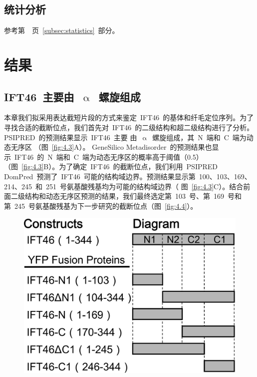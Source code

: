 \subsection{统计分析}
参考第\ \pageref{subsec:statistics}\ 页\ \ref{subsec:statistics}\ 部分。

\section{结果}
\subsection{IFT46\ 主要由\ \texorpdfstring{$\upalpha$}{α}\ 螺旋组成}
本章我们拟采用表达截短片段的方式来鉴定\ IFT46\ 的基体和纤毛定位序列。为了寻找合适的截断位点，我们首先对\ IFT46\ 的二级结构和超二级结构进行了分析。PSIPRED\ 的预测结果显示\ IFT46\ 主要
由\ $\upalpha$\ 螺旋组成，其\ N\ 端和\ C\ 端为动态无序区
（图\ \ref{fig:4.3}A）。 GeneSilico Metadisorder\ 的预测结果也显示\ IFT46\ 的\ N\ 端和\ C\ 端为动态无序区的概率高于阈值（0.5）
（图\ \ref{fig:4.3}B）。为了确定\ IFT46\ 的截断位点，我们利用\ PSIPRED DomPred\ 预测了\ IFT46\ 可能的结构域边界。预测结果显示第\ 100、103、169、214、245\ 和\ 251\ 号氨基酸残基均为可能的结构域边界（
图\ \ref{fig:4.3}C）。结合前面二级结构和动态无序区预测的结果，我们最终选定第\ 103\ 号、第\ 169\ 号和第\ 245\ 号氨基酸残基为下一步研究的截断位点（图\ \ref{fig:4.4}）。
\begin{figure}[htbp!]
\centering
\graphicspath{{figures/}}
\includegraphics[width=\textwidth-80mm]{fig4-4.jpg}
{
\par}
\end{figure}

